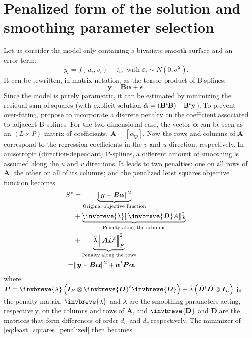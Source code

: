 \section{Penalized form of the solution and smoothing parameter selection}
\label{appendix:SpATS_add_comput_info}
Let us consider the model only containing a bivariate smooth surface and an error term:
\[
	    y _ { i } = f \left( u _ { i } , v _ { i } \right) + \varepsilon _ { i } , \text { with } \varepsilon _ { i } \sim N 
	    \left( 0 , \sigma ^ { 2 } \right) \text{.} 
	    \]
It can be rewritten, in matrix notation, as the tensor product of B-splines:
\[
    \boldsymbol{y} = \boldsymbol{B}\boldsymbol{\alpha} + \boldsymbol{\epsilon}
    \text{.}
\]
Since the model is purely parametric, it can be estimated by minimizing the residual sum of squares (with explicit solution $\Hat{\boldsymbol{\alpha}} = (\mathbf{B}^t\mathbf{B})^{-1}\mathbf{B}^t\mathbf{y}$). To prevent over-fitting, \textcite{eilers_flexible_1996} propose to incorporate a discrete penalty on the coefficient associated to adjacent B-splines. For the two-dimensional case, the vector $\boldsymbol{\alpha}$ can be seen as an  $(L \times P)$  matrix  of  coefficients, $\mathbf{A}=[\alpha_{lp}]$. Now the rows  and columns of $\mathbf{A}$ correspond to the regression coefficients in the $v$ and  $u$ direction, respectively. In anisotropic (direction-dependant) P-splines, a different amount of smoothing is assumed along the $u$ and $v$ directions. It leads to two penalties:  one on all rows of $\mathbf{A}$,  the other on all of its columns; and the penalized least squares objective function becomes \parencite{eilers_multivariate_2003}
\[
\begin{aligned}
    S^{*} & = \underbrace{\|\boldsymbol{y}-\boldsymbol{B} \boldsymbol{\alpha}\|^{2}}_{\text{Original objective function}} \\
    	  & +\underbrace{\invbreve{\lambda}\|\invbreve{\boldsymbol{D}} A\|_{F}^{2}}_{\text{Penalty along the columns}} \\
    	  & +\underbrace{\breve{\lambda}\left\|\boldsymbol{A} \breve{D}^{t}\right\|_{F}^{2}}_{\text{Penalty along the rows}} \\
    =	  & \|\boldsymbol{y}-\boldsymbol{B} \boldsymbol{\alpha}\|^{2}+\boldsymbol{\alpha}^{t} \boldsymbol{P} \boldsymbol{\alpha}
    \text{,}
\end{aligned}
\]
where $\boldsymbol{P}=\invbreve{\lambda}\left(\boldsymbol{I}_{P} \otimes \invbreve{\boldsymbol{D}}^{t} \invbreve{\boldsymbol{D}}\right)+\breve{\lambda}\left(\breve{\boldsymbol{D}}^{t} \breve{\boldsymbol{D}} \otimes \boldsymbol{I}_{L}\right)$ is the penalty matrix, $\invbreve{\lambda}$ and $\breve{\lambda}$ are the smoothing parameters acting, respectively, on the columns and rows of $\mathbf{A}$, and $\invbreve{\mathbf{D}}$ and $\breve{\mathbf{D}}$ are the matrices that form differences of order $d_u$ and $d_v$ respectively. The minimizer of \ref{eq:least_squares_penalized} then becomes 
